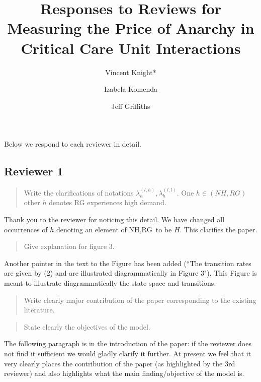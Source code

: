 \documentclass{article}
\title{Responses to Reviews for Measuring the Price of Anarchy in Critical Care Unit Interactions}
\author{Vincent Knight*
    \and
        Izabela Komenda
    \and
        Jeff Griffiths}
\newcommand{\NH}{\text{NH}}
\newcommand{\RG}{\text{RG}}
\begin{document}
\maketitle

Below we respond to each reviewer in detail.

\subsection{Reviewer 1}

\begin{quote}
    \begin{textit}{
Write the clarifications of notations \(\lambda_{h}^{(l,h)},\lambda_{h}^{(l,l)}\). One \(h \in (NH,RG)\) other \(h\) denotes RG experiences high demand.
    }\end{textit}
\end{quote}

Thank you to the reviewer for noticing this detail.
We have changed all occurrences of \(h\) denoting an element of \(\NH, \RG\) to
be \(H\). This clarifies the paper.

\begin{quote}
    \begin{textit}{
Give explanation for figure 3.
    }\end{textit}
\end{quote}

Another pointer in the text to the Figure has been added (``The transition rates are given by (2) and are illustrated diagrammatically in Figure 3"). This Figure is meant to illustrate diagrammatically the state space and transitions.

\begin{quote}
    \begin{textit}{
    Write clearly major contribution of the paper corresponding to the existing
    literature.
    }\end{textit}
\end{quote}

\begin{quote}
    \begin{textit}{
    State clearly the objectives of the model.
    }\end{textit}
\end{quote}

The following paragraph is in the introduction of the paper: if the reviewer does not find it sufficient we would gladly clarify it further. At present we feel that it very clearly places the contribution of the paper (as highlighted by the 3rd reviewer) and also highlights what the main finding/objective of the model is.
\end{document}
